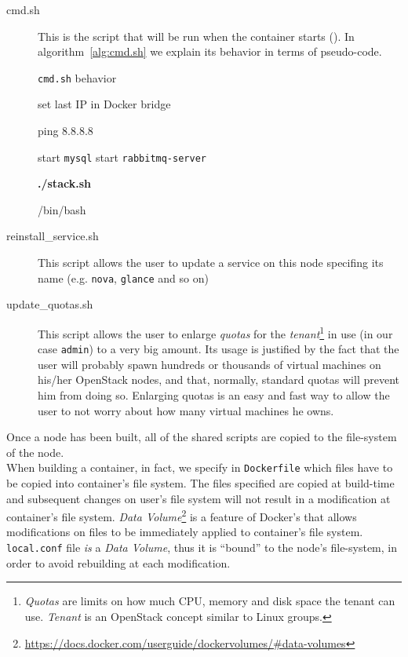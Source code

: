 \begin{description}
	\item[cmd.sh] This is the script that will be run when the container starts (). In algorithm~\ref{alg:cmd.sh} we explain its behavior in terms of pseudo-code.
	\begin{algorithm}[H]
	\caption{\texttt{cmd.sh} behavior}
	\label{alg:cmd.sh}
	\begin{algorithmic}[0]
			\State set last IP in Docker bridge 
		\EndIf

		\State ping 8.8.8.8 

			\State start \texttt{mysql}
			\State start \texttt{rabbitmq-server}
		\EndIf

		\State \textbf{./stack.sh} 

		\State /bin/bash 
	\end{algorithmic}
	\end{algorithm}
	
	\item[reinstall\_service.sh] This script allows the user to update a service on this node specifing its name (e.g. \texttt{nova}, \texttt{glance} and so on)

	\item[update\_quotas.sh] This script allows the user to enlarge \textit{quotas} for the \textit{tenant}\footnote{\textit{Quotas} are limits on how much CPU, memory and disk space the tenant can use. \textit{Tenant} is an OpenStack concept similar to Linux groups.} in use (in our case \texttt{admin}) to a very big amount. Its usage is justified by the fact that the user will probably spawn hundreds or thousands of virtual machines on his/her OpenStack nodes, and that, normally, standard quotas will prevent him from doing so. Enlarging quotas is an easy and fast way to allow the user to not worry about how many virtual machines he owns.
\end{description}

Once a node has been built, all of the shared scripts are copied to the file-system of the node.\\
When building a container, in fact, we specify in \texttt{Dockerfile} which files have to be copied into container's file system. The files specified are copied at build-time and subsequent changes on user's file system will not result in a modification at container's file system. \textit{Data Volume}\footnote{\url{https://docs.docker.com/userguide/dockervolumes/\#data-volumes}} is a feature of Docker's that allows modifications on files to be immediately applied to container's file system. \texttt{local.conf} file \emph{is} a \textit{Data Volume}, thus it is ``bound'' to the node's file-system, in order to avoid rebuilding at each modification.

